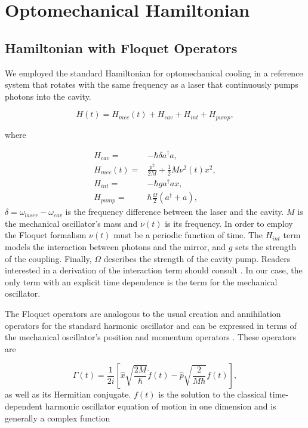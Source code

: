 \documentclass[reprint, amsmath,amssymb, aps,pra]{revtex4-1}
\begin{document}
\section{Optomechanical Hamiltonian}\label{OptmechH}
\subsection{Hamiltonian with Floquet Operators}
	
	We employed the standard Hamiltonian for optomechanical cooling \cite{LCNooshi} in a reference system that rotates with the same frequency as a laser that continuously pumps photons into the cavity. 

\begin{equation}
H(t) = H_{mec}(t) + H_{cav} + H_{int} + H_{pump},
\end{equation}

where

\begin{align}
H_{cav} =& -\hbar \delta a^\dagger a,\\
H_{mec}(t) =& \frac{p^2}{2M} + \frac{1}{2}M \nu^2 (t) x^2,\\
H_{int} =& -\hbar g a^\dagger a x,\\
H_{pump} =& \hbar\frac{\Omega}{2}(a^\dagger + a),
\end{align}
$\delta = \omega_{laser} - \omega_{cav}$ is the frequency difference
between the laser and the cavity. $M$ is the mechanical oscillator's
mass and $\nu(t)$ is its frequency. In order to employ the Floquet
formalism $\nu(t)$ must be a periodic function of time. The $H_{int}$
term models the interaction between photons and the mirror, and $g$
sets the strength of the coupling. Finally, $\Omega$ describes the strength
of the cavity pump. Readers interested in a derivation of the
interaction term should consult \cite{KippenberCO}. In our case, the only term with
an explicit time dependence is the term for the mechanical oscillator.

The Floquet operators are analogous to the usual creation and annihilation operators for the standard harmonic oscillator and can be expressed in terms of the
mechanical oscillator's position and momentum operators \cite{HanngiFM}. These operators are

\begin{equation}\label{FloquetOperators}
\Gamma(t) = \frac{1}{2i}\left[\hat{x}\sqrt{\frac{2M}{\hbar}}\dot{f}(t)-\hat{p}\sqrt{\frac{2}{M \hbar }}f(t)\right],
\end{equation} as well as its Hermitian conjugate. $f(t)$ is the solution to the classical time-dependent harmonic oscillator equation of motion in one dimension and is generally a complex function \cite{BrownPT}
\end{document}
